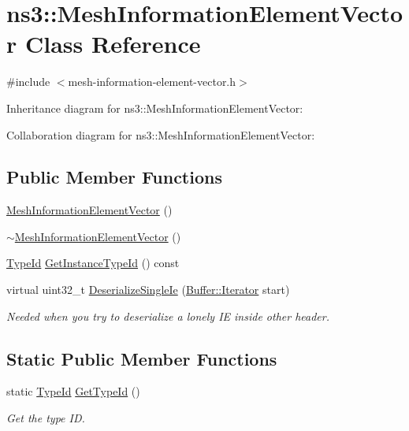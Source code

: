 \hypertarget{classns3_1_1MeshInformationElementVector}{}\section{ns3\+:\+:Mesh\+Information\+Element\+Vector Class Reference}
\label{classns3_1_1MeshInformationElementVector}


{\ttfamily \#include $<$mesh-\/information-\/element-\/vector.\+h$>$}



Inheritance diagram for ns3\+:\+:Mesh\+Information\+Element\+Vector\+:


Collaboration diagram for ns3\+:\+:Mesh\+Information\+Element\+Vector\+:
\subsection*{Public Member Functions}
\begin{DoxyCompactItemize}
\item 
\hyperlink{classns3_1_1MeshInformationElementVector_a572b7bca08ddcf72828e853086398b28}{Mesh\+Information\+Element\+Vector} ()
\item 
\hyperlink{classns3_1_1MeshInformationElementVector_aea277638da0ba10b2e6c364650e3db49}{$\sim$\+Mesh\+Information\+Element\+Vector} ()
\item 
\hyperlink{classns3_1_1TypeId}{Type\+Id} \hyperlink{classns3_1_1MeshInformationElementVector_a09e6733a6d80fbfbb599b3d1c42098fe}{Get\+Instance\+Type\+Id} () const 
\item 
virtual uint32\+\_\+t \hyperlink{classns3_1_1MeshInformationElementVector_afc490f34bbbeb9cf3738fc8a491c38f7}{Deserialize\+Single\+Ie} (\hyperlink{classns3_1_1Buffer_1_1Iterator}{Buffer\+::\+Iterator} start)
\begin{DoxyCompactList}\small\item\em Needed when you try to deserialize a lonely IE inside other header. \end{DoxyCompactList}\end{DoxyCompactItemize}
\subsection*{Static Public Member Functions}
\begin{DoxyCompactItemize}
\item 
static \hyperlink{classns3_1_1TypeId}{Type\+Id} \hyperlink{classns3_1_1MeshInformationElementVector_a9a268680a2c7abcdbeae25963aa3c6b0}{Get\+Type\+Id} ()
\begin{DoxyCompactList}\small\item\em Get the type ID. \end{DoxyCompactList}\end{DoxyCompactItemize}
